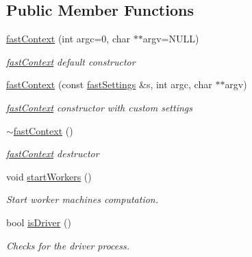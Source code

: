 \subsection*{Public Member Functions}
\begin{DoxyCompactItemize}
\item 
\hyperlink{classfaster_1_1fastContext_adf84c9fd9f1d768f1fb8ba8bdd13bb47}{fast\+Context} (int argc=0, char $\ast$$\ast$argv=N\+U\+LL)
\begin{DoxyCompactList}\small\item\em \hyperlink{classfaster_1_1fastContext}{fast\+Context} default constructor \end{DoxyCompactList}\item 
\hypertarget{classfaster_1_1fastContext_a6836e1da0e0400ee290376d7cdec4fae}{}\label{classfaster_1_1fastContext_a6836e1da0e0400ee290376d7cdec4fae} 
\hyperlink{classfaster_1_1fastContext_a6836e1da0e0400ee290376d7cdec4fae}{fast\+Context} (const \hyperlink{classfaster_1_1fastSettings}{fast\+Settings} \&s, int argc, char $\ast$$\ast$argv)
\begin{DoxyCompactList}\small\item\em \hyperlink{classfaster_1_1fastContext}{fast\+Context} constructor with custom settings \end{DoxyCompactList}\item 
\hypertarget{classfaster_1_1fastContext_a055ea19ba9b7597ebd8b2d950a2d7e06}{}\label{classfaster_1_1fastContext_a055ea19ba9b7597ebd8b2d950a2d7e06} 
\hyperlink{classfaster_1_1fastContext_a055ea19ba9b7597ebd8b2d950a2d7e06}{$\sim$fast\+Context} ()
\begin{DoxyCompactList}\small\item\em \hyperlink{classfaster_1_1fastContext}{fast\+Context} destructor \end{DoxyCompactList}\item 
void \hyperlink{classfaster_1_1fastContext_a1f6b1c1a940d67b434ac95bad4770508}{start\+Workers} ()
\begin{DoxyCompactList}\small\item\em Start worker machines computation. \end{DoxyCompactList}\item 
bool \hyperlink{classfaster_1_1fastContext_a4c4b1bc0cfe9f4e4a7959cc176d2ec24}{is\+Driver} ()
\begin{DoxyCompactList}\small\item\em Checks for the driver process. \end{DoxyCompactList}\item 

\end{DoxyCompactItemize}

